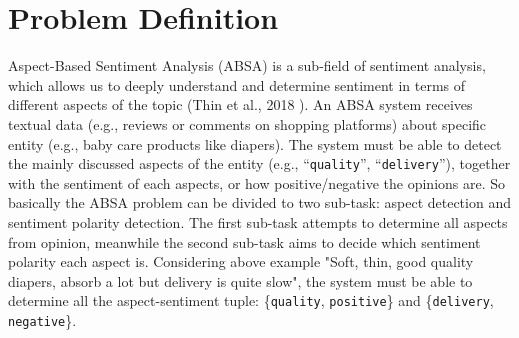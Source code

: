 \section{Problem Definition}

Aspect-Based Sentiment Analysis (ABSA) is a sub-field of sentiment analysis, which allows us to deeply understand and determine sentiment in terms of different aspects of the topic (Thin et al., 2018 \cite{van2018transformation}). An ABSA system receives textual data (e.g., reviews or comments on shopping platforms) about specific entity (e.g., baby care products like diapers). The system must be able to detect the mainly discussed aspects of the entity (e.g., ``\texttt{quality}'', ``\texttt{delivery}''), together with the sentiment of each aspects, or how positive/negative the opinions are. So basically the ABSA problem can be divided to two sub-task: aspect detection and sentiment polarity detection. The first sub-task attempts to determine all aspects from opinion, meanwhile the second sub-task aims to decide which sentiment polarity each aspect is. Considering above example "Soft, thin, good quality diapers, absorb a lot but delivery is quite slow", the system must be able to determine all the aspect-sentiment tuple: \{\texttt{quality}, \texttt{positive}\} and \{\texttt{delivery}, \texttt{negative}\}.




